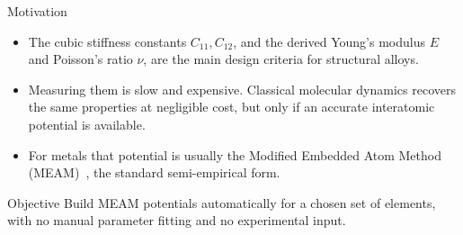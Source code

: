 \begin{frame}{Motivation}
\begin{itemize}
  \item The cubic stiffness constants $C_{11}, C_{12}$, and the derived
        Young's modulus $E$ and Poisson's ratio $\nu$, are the main design
        criteria for structural alloys.
  \item Measuring them is slow and expensive. Classical molecular dynamics
        recovers the same properties at negligible cost, but only if an
        accurate interatomic potential is available.
  \item For metals that potential is usually the Modified Embedded Atom
        Method (MEAM)~\citep{baskes1992,lee2001}, the standard
        semi-empirical form.
\end{itemize}

\vspace{0.6em}
\begin{block}{Objective}
Build MEAM potentials automatically for a chosen set of elements, with no
manual parameter fitting and no experimental input.
\end{block}
\end{frame}
